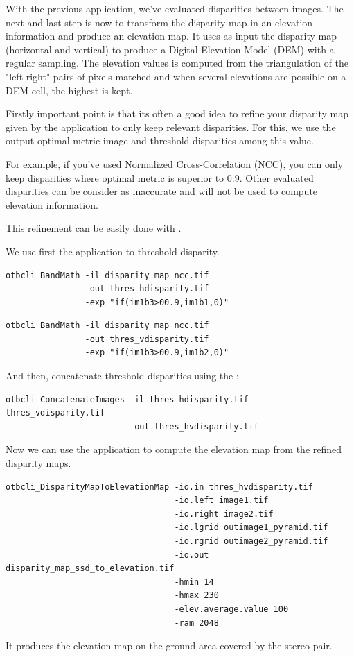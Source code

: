 With the previous application, we've evaluated disparities between images. The
next and last step is now to transform the disparity map in an elevation
information and produce an elevation map.  It uses as input the disparity map
(horizontal and vertical) to produce a Digital Elevation Model (DEM) with a
regular sampling. The elevation values is computed from the triangulation of the
"left-right" pairs of pixels matched and when several elevations are possible on
a DEM cell, the highest is kept.

Firstly important point is that its often a good idea to refine your disparity
map given by the  application to only keep relevant
disparities. For this, we use the output optimal metric image and threshold
disparities among this value.

For example, if you've used Normalized Cross-Correlation (NCC), you can only
keep disparities where optimal metric is superior to $0.9$. Other evaluated
disparities can be consider as inaccurate and will not be used to compute
elevation information.

This refinement can be easily done with \app.

We use first the  application to threshold disparity.

\begin{verbatim}
otbcli_BandMath -il disparity_map_ncc.tif
                -out thres_hdisparity.tif
                -exp "if(im1b3>00.9,im1b1,0)"
\end{verbatim}

\begin{verbatim}
otbcli_BandMath -il disparity_map_ncc.tif
                -out thres_vdisparity.tif
                -exp "if(im1b3>00.9,im1b2,0)"
\end{verbatim}

And then, concatenate threshold disparities using the :

\begin{verbatim}
otbcli_ConcatenateImages -il thres_hdisparity.tif  thres_vdisparity.tif
                         -out thres_hvdisparity.tif
\end{verbatim}

Now we can use the  application to
compute the elevation map from the refined disparity maps.

\begin{verbatim}
otbcli_DisparityMapToElevationMap -io.in thres_hvdisparity.tif
                                  -io.left image1.tif
                                  -io.right image2.tif
                                  -io.lgrid outimage1_pyramid.tif
                                  -io.rgrid outimage2_pyramid.tif
                                  -io.out disparity_map_ssd_to_elevation.tif
                                  -hmin 14
                                  -hmax 230
                                  -elev.average.value 100
                                  -ram 2048
\end{verbatim}

It produces the elevation map on the ground area covered by the stereo pair.

